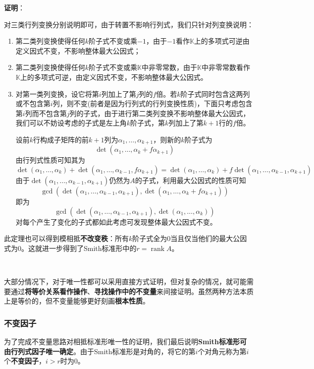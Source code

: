\documentclass[a4paper,UTF8,fontset=windows,AutoFakeBold]{ctexart}
\DeclareMathOperator{\rank}{rank}
\newcommand*{\note}{\noindent *}
\newcommand{\proo}[1]{{\vspace{5pt}\kaishu\noindent\textbf{证明}：\vspace{-3pt}
\begin{compactitem}
    \item[] #1
\end{compactitem}
}}
\begin{document}
\proo{
    对三类行列变换分别说明即可，由于转置不影响行列式，我们只针对列变换说明：
    \begin{enumerate}
        \item 第二类列变换使得任何$k$阶子式不变或乘$-1$，由于$-1$看作$\mathbb{K}$上的多项式可逆由定义因式不变，不影响整体最大公因式；
        \item 第二类列变换使得任何$k$阶子式不变或乘$\mathbb{K}$中非零常数，由于$\mathbb{K}$中非零常数看作$\mathbb{K}$上的多项式可逆，由定义因式不变，不影响整体最大公因式。
        \item 对第一类列变换，设它将第$i$列加上了第$j$列的$f$倍。若$k$阶子式同时包含这两列或不包含第$i$列，则不变(前者是因为行列式的行列变换性质)，下面只考虑包含第$i$列而不包含第$j$列的子式，由于进行第二类列变换不影响整体最大公因式，我们可以不妨设考虑的子式是左上角$k$阶子式，第$k$列加上了第$k+1$行的$f$倍。
        
        设前$k$行构成子矩阵的前$k+1$列为$\alpha_1,\dots,\alpha_{k+1}$，则新的$k$阶子式为
        $$\det(\alpha_1,\dots,\alpha_k+f\alpha_{k+1})$$
        由行列式性质可知其为
        $$\det(\alpha_1,\dots,\alpha_k)+\det(\alpha_1,\dots,\alpha_{k-1},f\alpha_{k+1})=\det(\alpha_1,\dots,\alpha_k)+f\det(\alpha_1,\dots,\alpha_{k-1},\alpha_{k+1})$$
        由于$\det(\alpha_1,\dots,\alpha_{k-1},\alpha_{k+1})$仍然为$A$的子式，利用最大公因式的性质可知
        $$\gcd(\det(\alpha_1,\dots,\alpha_{k-1},\alpha_{k+1}),\det(\alpha_1,\dots,\alpha_k+f\alpha_{k+1}))$$
        即为
        $$\gcd(\det(\alpha_1,\dots,\alpha_{k-1},\alpha_{k+1}),\det(\alpha_1,\dots,\alpha_k))$$
        对每个产生了变化的子式都如此考虑可发现整体最大公因式不变。
    \end{enumerate}
}

\note 此定理也可以得到模相抵\textbf{不改变秩}：所有$k$阶子式全为0当且仅当他们的最大公因式为0。这就进一步得到了Smith标准形中的$r=\rank A$。

\

\note 大部分情况下，对于唯一性都可以采用直接方式证明，但对复杂的情况，就可能需要通过\textbf{将等价关系看作操作}、\textbf{寻找操作中的不变量}来间接证明。虽然两种方法本质上是等价的，但不变量能够更好刻画\textbf{根本性质}。

\subsubsection{不变因子}
为了完成不变量思路对相抵标准形唯一性的证明，我们最后说明\textbf{Smith标准形可由行列式因子唯一确定}。由于Smith标准形是对角的，将它的第$i$个对角元称为第$i$个\textbf{不变因子}，$i>r$时为0。
\end{document}
